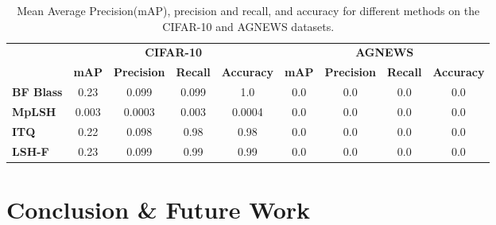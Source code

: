 \documentclass{article}
\begin{document}
            	
\begin{table}[ht]
\caption{Mean Average Precision(mAP), precision and recall, and accuracy for different methods on the CIFAR-10 and  AGNEWS  datasets. }
\label{table:map2}
\centering
\begin{footnotesize}
\begin{tabular}{l|c|c|c|c|c|c|c|c|}
\cline{2-9}
     & \multicolumn{4}{c|}{\textbf{CIFAR-10}}            & \multicolumn{4}{c|}{\textbf{AGNEWS}} \\ \cline{2-9} 
     & \textbf{mAP} & \textbf{Precision} & \textbf{Recall} & \textbf{Accuracy} & \textbf{mAP} & \textbf{Precision} & \textbf{Recall} & \textbf{Accuracy}\\ \hline
\multicolumn{1}{|l|}{\textbf{BF Blass  \cite{multiprobe}}}       & 0.23        & 0.099  & 0.099 & 1.0    & 0.0         & 0.0            & 0.0    & 0.0\\ \hline
\multicolumn{1}{|l|}{\textbf{MpLSH \cite{multiprobe}}}         & 0.003         & 0.0003    & 0.003        & 0.0004      & 0.0         & 0.0            & 0.0    & 0.0  \\ \hline
\multicolumn{1}{|l|}{\textbf{ITQ \cite{itq}}}        & 0.22         & 0.098            & 0.98  & 0.98      & 0.0         & 0.0            & 0.0    & 0.0\\ \hline
\multicolumn{1}{|l|}{\textbf{LSH-F \cite{lshforest}}}       & 0.23         & 0.099            & 0.99  &  0.99    & 0.0         & 0.0            & 0.0 & 0.0  \\ \hline
\end{tabular}
\end{footnotesize}
\end{table}
            	
\section{Conclusion \& Future Work}
 



\end{document}
